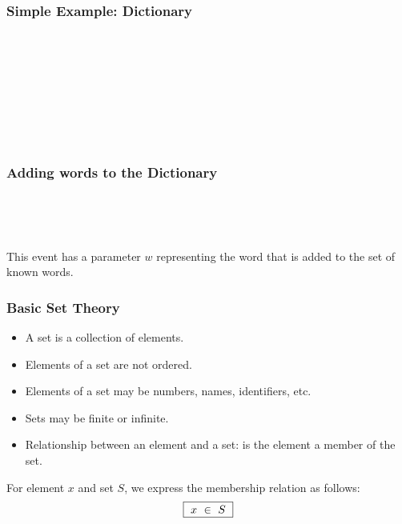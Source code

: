 \documentclass{beamer}
\begin{document}
\begin{frame}


\frametitle{Simple Example: Dictionary }

\ENDC\\

~

~


~


~



\end{frame}




\begin{frame}

\frametitle{Adding  words to the Dictionary }

\operations
{}

~

~

This event has a \alert{parameter} $w$ representing the word that is added to the set of known words.

\end{frame}







\begin{frame}
\frametitle{Basic Set Theory}
\begin{itemize}
\item 
A \alert{set} is a collection of \alert{elements}.  

\item Elements of a set are \alert{not ordered}.

\item Elements of a set may be numbers, names, identifiers, etc.

\item Sets may be \alert{finite} or \alert{infinite}.

\item Relationship between an element and a set:  is the element a \alert{member} of the set.

\end{itemize}

For \alert{element $x$} and \alert{set $S$,} we express the \alert{membership relation} as follows:
\begin{eqnarray*}
\fbox{~$
    x  ~\in~ S
~$}
\end{eqnarray*}


\end{frame}
\end{document}

